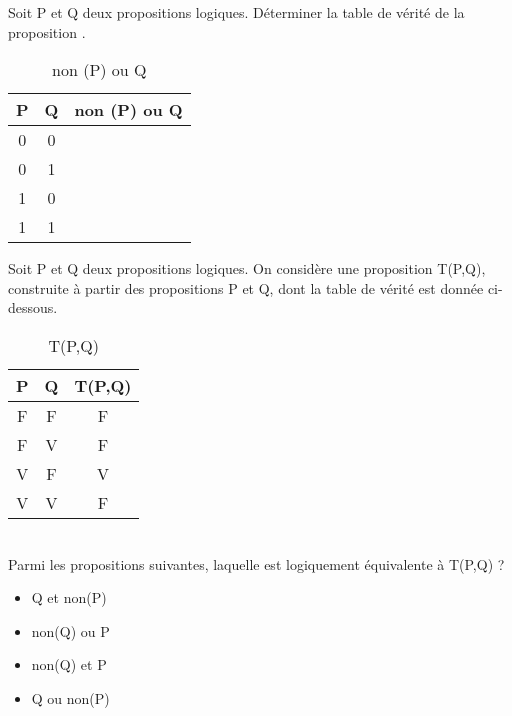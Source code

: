 \documentclass[a4paper,11pt]{article}
\begin{document}
\begin{exo}
Soit P et Q deux propositions logiques. Déterminer la table de vérité de la proposition .
\begin{table}[!h]
\begin{center}
\begin{tabular}{|c|c|c|}
\hline 
P & Q & non (P) ou Q \\ 
\hline 
0 & 0 &  \\ 
\hline 
0 & 1 & \\ 
\hline 
1 & 0 & \\
\hline 
1 & 1 & \\
\hline 
\end{tabular}
\caption{\label{ex1}non (P) ou Q}
\end{center}
\end{table} 
\end{exo}
\begin{exo}
Soit P et Q deux propositions logiques. On considère une proposition T(P,Q), construite à partir des propositions P et Q, dont la table de vérité est donnée ci-dessous. 
\begin{table}[!h]
\begin{center}
\begin{tabular}{|c|c|c|}
\hline 
P & Q & T(P,Q) \\ 
\hline 
F & F & F \\ 
\hline 
F & V & F \\ 
\hline 
V & F & V \\
\hline 
V & V & F \\
\hline 
\end{tabular}
\caption{\label{ex2}T(P,Q)}
\end{center}
\end{table} 
\\Parmi les propositions suivantes, laquelle est logiquement équivalente à T(P,Q) ?
\begin{itemize}
\item Q et non(P)
\item non(Q) ou P
\item non(Q) et P
\item Q ou non(P)
\end{itemize}
\end{exo}
\end{document}
